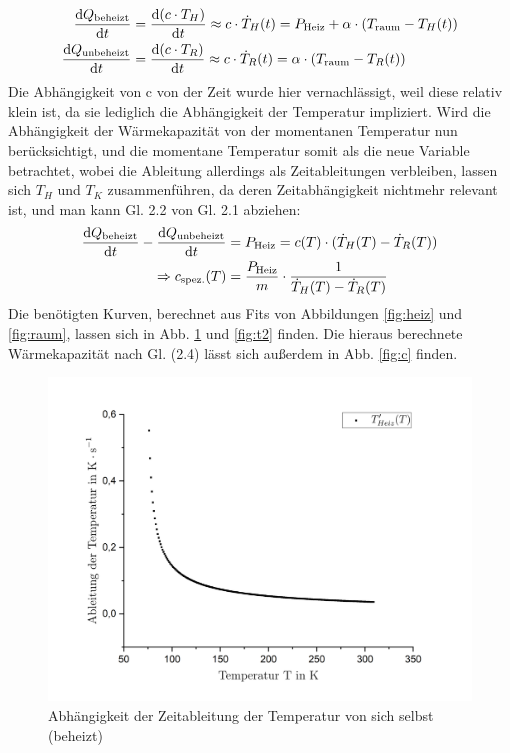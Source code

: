 \documentclass{include/protokollclass}
\begin{document}
\begin{align}
    \frac{\text{d} Q_\text{beheizt}}{\text{d} t} &= \frac{\text{d} (c\cdot T_H)}{\text{d} t} \approx c\cdot \dot{T}_H(t) = P_\text{Heiz} + \alpha \cdot (T_\text{raum}-T_H(t)) \\
    \frac{\text{d} Q_\text{unbeheizt}}{\text{d} t} &= \frac{\text{d} (c\cdot T_R)}{\text{d} t} \approx c\cdot \dot{T}_R(t) = \alpha \cdot (T_\text{raum}-T_R(t))
\end{align}
Die Abhängigkeit von c von der Zeit wurde hier vernachlässigt, weil diese relativ klein ist, da sie lediglich die Abhängigkeit der Temperatur impliziert. Wird die Abhängigkeit der Wärmekapazität von der momentanen Temperatur nun berücksichtigt, und die momentane Temperatur somit als die neue Variable betrachtet, wobei die Ableitung allerdings als Zeitableitungen verbleiben, lassen sich $T_H$ und $T_K$ zusammenführen, da deren Zeitabhängigkeit nichtmehr relevant ist, und man kann Gl. 2.2 von Gl. 2.1 abziehen:
\begin{align}
    \frac{\text{d} Q_\text{beheizt}}{\text{d} t} - \frac{\text{d} Q_\text{unbeheizt}}{\text{d} t} &= P_\text{Heiz} = c(T) \cdot (\dot{T}_H(T)-\dot{T}_R(T)) \\
    \Rightarrow c_\text{spez.}(T) &= \frac{P_\text{Heiz}}{m} \cdot \frac{1}{\dot{T}_H(T)-\dot{T}_R(T)}
\end{align}
Die benötigten Kurven, berechnet aus Fits von Abbildungen \ref{fig:heiz} und \ref{fig:raum}, lassen sich in Abb. \ref{fig:t1} und \ref{fig:t2} finden. Die hieraus berechnete Wärmekapazität nach Gl. (2.4) lässt sich außerdem in Abb. \ref{fig:c} finden.
\begin{figure}[H]
    \centering
    \includegraphics[scale=0.5]{fig/A2T'T.png}
    \caption{Abhängigkeit der Zeitableitung der Temperatur von sich selbst (beheizt)}
    \label{fig:t1}
\end{figure}
\end{document}
